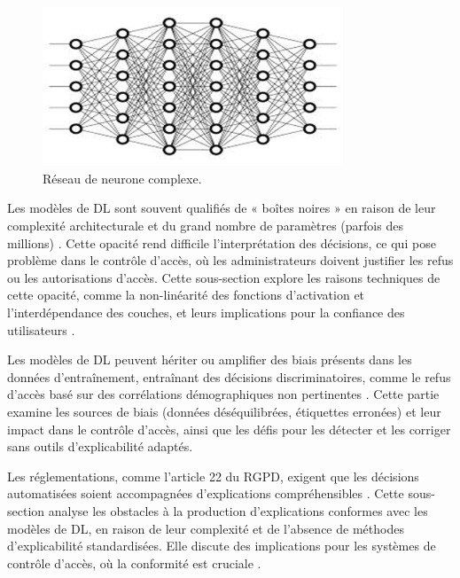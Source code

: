\begin{figure}[h]
    \centering
    \includegraphics[width=0.8\textwidth]{My-Thesis/Chap1/images/lstm.png}
    \caption{Réseau de neurone complexe.}
    \label{fig:lstm_sequence}
\end{figure}

Les modèles de DL sont souvent qualifiés de « boîtes noires » en raison de leur complexité architecturale et du grand nombre de paramètres (parfois des millions) \cite{rudin2019stop}. Cette opacité rend difficile l’interprétation des décisions, ce qui pose problème dans le contrôle d’accès, où les administrateurs doivent justifier les refus ou les autorisations d’accès. Cette sous-section explore les raisons techniques de cette opacité, comme la non-linéarité des fonctions d’activation et l’interdépendance des couches, et leurs implications pour la confiance des utilisateurs \cite{jouis2020}.

Les modèles de DL peuvent hériter ou amplifier des biais présents dans les données d’entraînement, entraînant des décisions discriminatoires, comme le refus d’accès basé sur des corrélations démographiques non pertinentes \cite{slack2020fooling}. Cette partie examine les sources de biais (données déséquilibrées, étiquettes erronées) et leur impact dans le contrôle d’accès, ainsi que les défis pour les détecter et les corriger sans outils d’explicabilité adaptés.

Les réglementations, comme l’article 22 du RGPD, exigent que les décisions automatisées soient accompagnées d’explications compréhensibles \cite{goodman2017gdpr}. Cette sous-section analyse les obstacles à la production d’explications conformes avec les modèles de DL, en raison de leur complexité et de l’absence de méthodes d’explicabilité standardisées. Elle discute des implications pour les systèmes de contrôle d’accès, où la conformité est cruciale \cite{desmoulin2019}.


